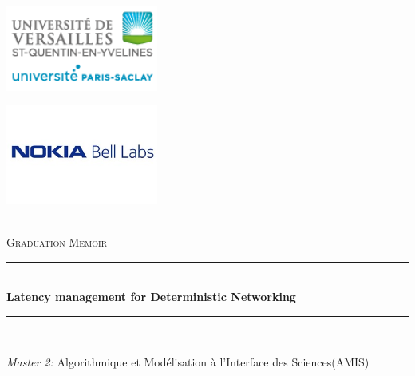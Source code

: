 \documentclass[a4paper,10pt]{report}
\newcommand{\reporttitle}{Latency management for Deterministic Networking}     %
\newcommand{\reportsubject}{Graduation Memoir}
\newcommand{\HRule}{\rule{\linewidth}{0.5mm}}
\begin{document}
\begin{titlepage}

\begin{center}



\begin{minipage}[t]{0.48\textwidth}
  \begin{flushleft} \large
       \includegraphics [width=50mm]{logo.png} \\[0.5cm]
  \end{flushleft}
\end{minipage}
\begin{minipage}[t]{0.48\textwidth}
  \begin{flushright} \large
    \includegraphics [width=50mm]{logon.png} \\[0.5cm]
  \end{flushright}
\end{minipage}
 \\[3cm]

\textsc{\Large \reportsubject}\\[0.5cm]
\HRule \\[0.4cm]
{\huge \bfseries \reporttitle}\\[0.4cm]
\HRule \\[1.5cm]

\begin{minipage}[t]{1.0\textwidth}
  \begin{center} \large
    \emph{Master 2:} 
   Algorithmique et Modélisation à l'Interface des Sciences(AMIS) \\

  \end{center}
  \end{minipage}
  \\[3cm]
 

\end{center}
\end{titlepage}
\end{document}
